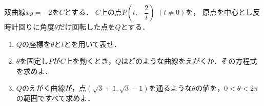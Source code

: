 \documentclass[../../main.tex]{subfiles}
\begin{document}
双曲線$xy=-2$を$C$とする．
$C$上の点$\displaystyle P \left( t,-\dfrac{2}{t} \right)$ $(t \neq 0)$を，
原点を中心とし反時計回りに角度$\theta$だけ回転した点を$Q$とする．
\begin{enumerate}
  \item $Q$の座標を$\theta$と$t$とを用いて表せ．
  \item $\theta$を固定し$P$が$C$上を動くとき，$Q$はどのような曲線をえがくか．その方程式を求めよ．
  \item $Q$のえがく曲線が，点$(\sqrt{3}+1,\sqrt{3}-1)$を通るような$\theta$の値を，$0< \theta <2\pi$の範囲ですべて求めよ．
\end{enumerate}
\end{document}
